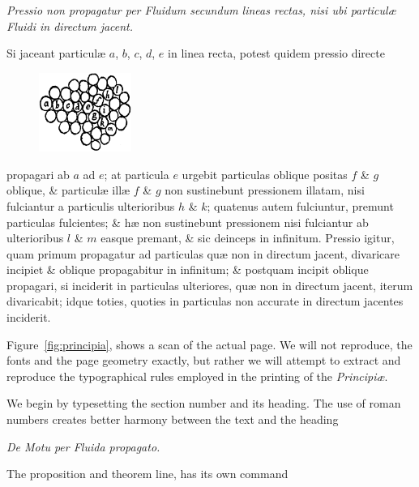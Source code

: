 \textit{Pressio non propagatur per Fluidum secundum lineas rectas, nisi
ubi particul{\ae} Fluidi in directum jacent.}

Si jaceant particul{\ae} $a$, $b$, $c$, $d$, $e$ in linea recta, potest quidem
pressio directe

\begin{figure}
  \vspace{-17pt}
  \includegraphics[width=0.27\textwidth]{images/362.png}
\end{figure}

\noindent propagari  ab $a$ ad $e$; at
particula $e$ urgebit particulas oblique positas
$f$ \& $g$ oblique, \& particul{\ae} ill{\ae} $f$ \& $g$
non sustinebunt pressionem illatam, nisi fulciantur
a particulis ulterioribus $h$ \& $k$;
quatenus autem fulciuntur, premunt particulas
fulcientes; \& h{\ae} non sustinebunt pressionem nisi fulciantur
ab ulterioribus $l$ \& $m$ easque premant, \& sic deinceps in infinitum.
Pressio igitur, quam primum propagatur ad particulas
qu{\ae} non in directum jacent, divaricare incipiet \& oblique propagabitur
in infinitum; \& postquam incipit oblique propagari, si
inciderit in particulas ulteriores, qu{\ae} non in directum jacent, iterum
divaricabit; idque toties, quoties in particulas non accurate
in directum jacentes inciderit. \QEDit

\topline

\vspace*{-\baselineskip}
\egroup
\smallskip
Figure~\ref{fig:principia}, shows a scan of the actual page. We will not reproduce, the fonts and the page geometry exactly, but rather we will attempt to extract and reproduce the typographical rules employed in the printing of the \textit{Principi\ae}.

We begin by typesetting the section number and its heading. The use of roman numbers creates better harmony between the text and the heading

\begin{teX}
\begin{center}{\textit{De Motu per Fluida propagato.}}\end{center}
\end{teX}
The proposition and theorem line, has its own command
\begin{teX}
\end{teX}

